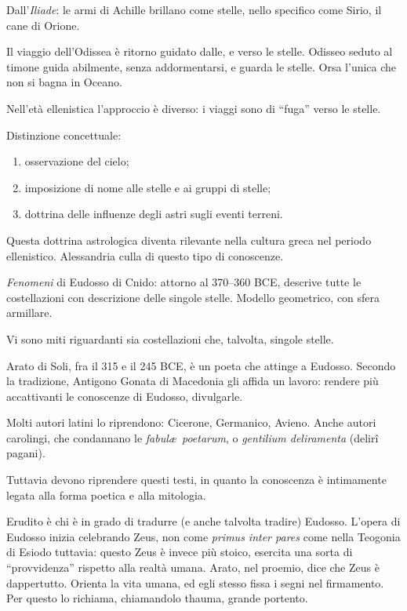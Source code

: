 \documentclass[main.tex]{subfiles}
\begin{document}

Dall'\emph{Iliade}: le armi di Achille brillano come stelle, nello specifico come Sirio, il cane di Orione. 

Il viaggio dell'Odissea è ritorno guidato dalle, e verso le stelle.
Odisseo seduto al timone guida abilmente, senza addormentarsi, e guarda le stelle. 
Orsa l'unica che non si bagna in Oceano.

Nell'età ellenistica l'approccio è diverso: i viaggi sono di ``fuga'' verso le stelle.

Distinzione concettuale:
\begin{enumerate}
    \item osservazione del cielo;
    \item imposizione di nome alle stelle e ai gruppi di stelle;
    \item dottrina delle influenze degli astri sugli eventi terreni.
\end{enumerate}

Questa dottrina astrologica diventa rilevante nella cultura greca nel periodo ellenistico.
Alessandria culla di questo tipo di conoscenze.

\emph{Fenomeni} di Eudosso di Cnido: attorno al 370--360 BCE, descrive tutte le costellazioni con descrizione delle singole stelle. Modello geometrico, con sfera armillare.

Vi sono miti riguardanti sia costellazioni che, talvolta, singole stelle. 

Arato di Soli, fra il 315 e il 245 BCE, è un poeta che attinge a Eudosso. Secondo la tradizione, Antigono Gonata di Macedonia gli affida un lavoro: rendere più accattivanti le conoscenze di Eudosso, divulgarle.

Molti autori latini lo riprendono: Cicerone, Germanico, Avieno. 
Anche autori carolingi, che condannano le \emph{fabul\ae\ poetarum}, o \emph{gentilium deliramenta} (delirî pagani).

Tuttavia devono riprendere questi testi, in quanto la conoscenza è intimamente legata alla forma poetica e alla mitologia.

Erudito è chi è in grado di tradurre (e anche talvolta tradire) Eudosso.
L'opera di Eudosso inizia celebrando Zeus, non come \emph{primus inter pares} come nella Teogonia di Esiodo tuttavia: questo Zeus è invece più stoico, esercita una sorta di ``provvidenza'' rispetto alla realtà umana.
Arato, nel proemio, dice che Zeus è dappertutto. Orienta la vita umana, ed egli stesso fissa i segni nel firmamento. 
Per questo lo richiama, chiamandolo thauma, grande portento.
\end{document}

